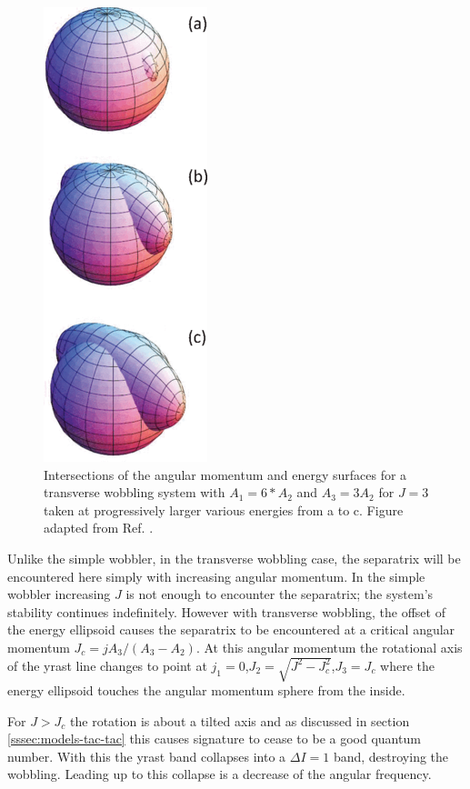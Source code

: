 \begin{figure}[t!]
\centerline{\includegraphics[height=0.4\textheight]{./img/c2/transverse_am_orbits.png}}
	\caption{Intersections of the angular momentum and energy surfaces for a transverse wobbling system with $A_1=6*A_2$ and $A_3=3A_2$ for $J=3$ taken at progressively larger various energies from a to c. Figure adapted from Ref. \cite{frauendorfTransverseWobbling}.\label{fig:chp2-transverse-am-orbits}}
\end{figure}

Unlike the simple wobbler, in the transverse wobbling case, the separatrix will be encountered here simply with increasing angular momentum. In the simple wobbler increasing $J$ is not enough to encounter the separatrix; the system's stability continues indefinitely. However with transverse wobbling, the offset of the energy ellipsoid causes the separatrix to be encountered at a critical angular momentum $J_c=jA_3/(A_3-A_2)$. At this angular momentum the rotational axis of the yrast line changes to point at $j_1=0$,$J_2=\sqrt{J^2-J^2_c}$,$J_3=J_c$ where the energy ellipsoid touches the angular momentum sphere from the inside.

For $J>J_c$ the rotation is about a tilted axis and as discussed in section \ref{sssec:models-tac-tac} this causes signature to cease to be a good quantum number. With this the yrast band collapses into a $\Delta{}I=1$ band, destroying the wobbling. Leading up to this collapse is a decrease of the angular frequency.

